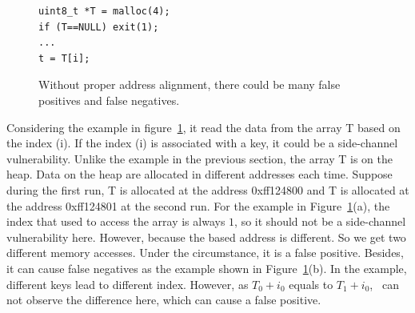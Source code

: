 \begin{figure}[h]
  \begin{minipage}{0.45\linewidth}
    \begin{lstlisting}[numbers=none,xleftmargin=.1\textwidth,xrightmargin=.2\textwidth]
uint8_t *T = malloc(4);
if (T==NULL) exit(1);
...
t = T[i];    
\end{lstlisting}
  \end{minipage}
  \hfill
  \begin{minipage}{0.6\linewidth}
  \end{minipage}
  \caption{Without proper address alignment, there could be many false positives and false negatives.}\label{fig:align}
\end{figure}

Considering the example in figure~\ref{fig:align}, it read the data from the array \textsf{T} based on the index (i). If the index (i) is associated with a key, it could be a side-channel vulnerability. Unlike the example in the previous section, the array \textsf{T} is on the heap. Data on the heap are allocated in different addresses each time. Suppose during the first run, \textsf{T} is allocated at the address \textsf{0xff124800} and \textsf{T} is allocated at the address \textsf{0xff124801} at the second run. For the example in Figure~\ref{fig:align}(a), the index that used to access the array is always $1$, so it should not be a side-channel vulnerability here. However, because the based address is different. So we get two different memory accesses. Under the circumstance, it is a false positive. Besides, it can cause false negatives as the example shown in Figure~\ref{fig:align}(b). In the example, different keys lead to different index. However, as $T_0 + i_0$ equals to $T_1 + i_0$, \ can not observe the difference here, which can cause a false positive.

